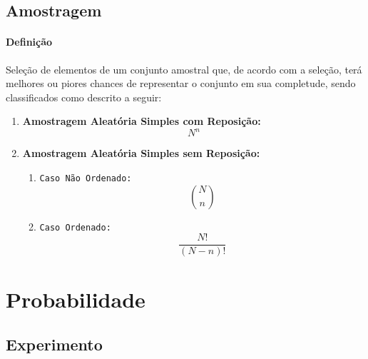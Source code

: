 \documentclass{article}
\begin{document}
        \subsection{Amostragem}
            \paragraph{Definição}Seleção de elementos de um conjunto amostral que, de acordo com a seleção, terá melhores ou piores chances de representar o conjunto em sua completude, sendo classificados como descrito a seguir:
                \begin{enumerate}[noitemsep]
                    \item \textbf{Amostragem Aleatória Simples com Reposição:} 
                        \begin{equation}
                            \boxed{
                                N^{n}
                            }
                        \end{equation}
                    \item \textbf{Amostragem Aleatória Simples sem Reposição:} 
                        \begin{enumerate}[noitemsep]
                            \item \texttt{Caso Não Ordenado:} 
                                \begin{equation}
                                    \boxed{
                                        \binom{N}{n}
                                    }
                                \end{equation}
                            \item \texttt{Caso Ordenado:} 
                                \begin{equation}
                                    \boxed{
                                        \frac{N!}{(N - n)!}
                                    }
                                \end{equation}
                        \end{enumerate}
                \end{enumerate}

\newpage

    \section{Probabilidade}
        \subsection{Experimento}
\end{document}
